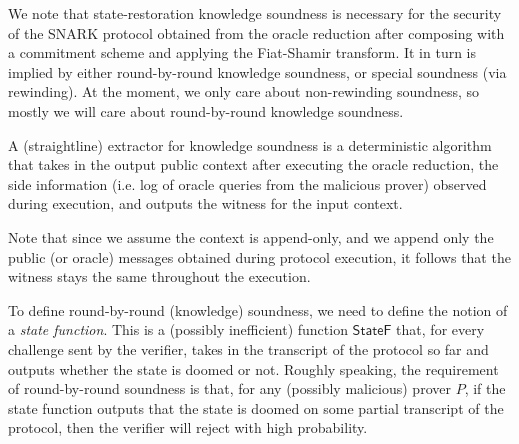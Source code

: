 We note that state-restoration knowledge soundness is necessary for the security of the SNARK
protocol obtained from the oracle reduction after composing with a commitment scheme and applying
the Fiat-Shamir transform. It in turn is implied by either round-by-round knowledge soundness, or
special soundness (via rewinding). At the moment, we only care about non-rewinding soundness, so mostly we will care about round-by-round knowledge soundness.

\begin{definition}[Soundness]
    \label{def:soundness}
\end{definition}

A (straightline) extractor for knowledge soundness is a deterministic algorithm that takes in the output public context after executing the oracle reduction, the side information (i.e. log of oracle queries from the malicious prover) observed during execution, and outputs the witness for the input context.

Note that since we assume the context is append-only, and we append only the public (or oracle)
messages obtained during protocol execution, it follows that the witness stays the same throughout
the execution.

\begin{definition}
    \label{def:knowledge_soundness}
\end{definition}

To define round-by-round (knowledge) soundness, we need to define the notion of a \emph{state function}. This is a (possibly inefficient) function $\mathsf{StateF}$ that, for every challenge sent by the verifier, takes in the transcript of the protocol so far and outputs whether the state is doomed or not. Roughly speaking, the requirement of round-by-round soundness is that, for any (possibly malicious) prover $P$, if the state function outputs that the state is doomed on some partial transcript of the protocol, then the verifier will reject with high probability.

\begin{definition}
    \label{def:state_function}
\end{definition}

\begin{definition}
    \label{def:round_by_round_soundness}
\end{definition}


